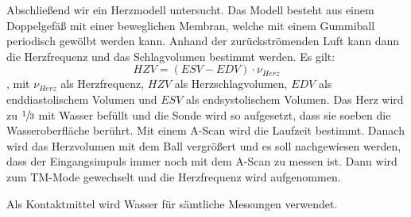 Abschließend wir ein Herzmodell untersucht. Das Modell besteht aus
einem Doppelgefäß mit einer beweglichen Membran, welche mit einem Gummiball periodisch gewölbt werden
kann. Anhand der zurückströmenden Luft kann dann die Herzfrequenz und das Schlagvolumen
bestimmt werden. Es gilt:
\begin{equation}
  HZV = (ESV - EDV)\cdot  \nu_{Herz}
\end{equation}
, mit $\nu_{Herz}$ als Herzfrequenz, $HZV$ als Herzschlagvolumen, $EDV$ als
enddiastolischem Volumen und $ESV$ als endsystolischem Volumen.
Das Herz wird zu $\sfrac{1}{3}$ mit Wasser befüllt und die Sonde wird so aufgesetzt,
dass sie soeben die Wasseroberfläche berührt. Mit einem A-Scan wird die Laufzeit
bestimmt. Danach wird das Herzvolumen mit dem Ball vergrößert und es soll nachgewiesen
werden, dass der Eingangsimpuls immer noch mit dem A-Scan zu messen ist.
Dann wird zum TM-Mode gewechselt und die Herzfrequenz wird aufgenommen.

Als Kontaktmittel wird Wasser für sämtliche Messungen verwendet.
